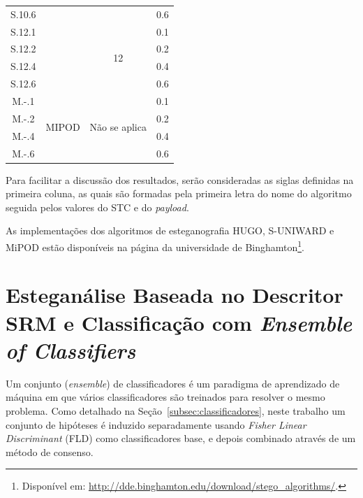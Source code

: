 \begin{table}[!htb]
\begin{tabular}{|c|c|c|c|}
 S.10.6&                   &                   &  0.6\\ \cline{1-1} \cline{3-4} 
S.12.1&                   & \multirow{4}{*}{12} &  0.1\\ \cline{1-1} \cline{4-4} 
 S.12.2&                   &                   &  0.2\\ \cline{1-1} \cline{4-4} 
 S.12.4&                   &                   &  0.4\\ \cline{1-1} \cline{4-4} 
 S.12.6&                   &                   &  0.6\\ \hline
M.-.1 & \multirow{4}{*}{MIPOD} & \multirow{4}{*}{Não se aplica} & 0.1 \\ \cline{1-1} \cline{4-4} 
 M.-.2  &                   &                   & 0.2 \\ \cline{1-1} \cline{4-4} 
 M.-.4 &                   &                   &  0.4 \\ \cline{1-1} \cline{4-4} 
 M.-.6 &                   &                   &  0.6\\ \hline

\end{tabular}
\end{table}

Para facilitar a discussão dos resultados, serão consideradas as siglas definidas na primeira coluna, as quais são formadas pela primeira letra do nome do algoritmo seguida pelos valores do STC e do \textit{payload}. 
 
As implementações dos algoritmos de esteganografia HUGO, S-UNIWARD e MiPOD estão disponíveis na página da universidade de Binghamton\footnote{Disponível em: \url{http://dde.binghamton.edu/download/stego_algorithms/}.}.

\section{Esteganálise Baseada no Descritor SRM e Classificação com \textit{Ensemble of Classifiers}}


Um conjunto (\textit{ensemble}) de classificadores é um paradigma de aprendizado de máquina em que vários classificadores são treinados para resolver o mesmo problema. Como detalhado na Seção~\ref{subsec:classificadores}, neste trabalho um conjunto de hipóteses é induzido separadamente usando \textit{Fisher Linear Discriminant} (FLD) como classificadores base, e depois combinado através de um método de consenso.

